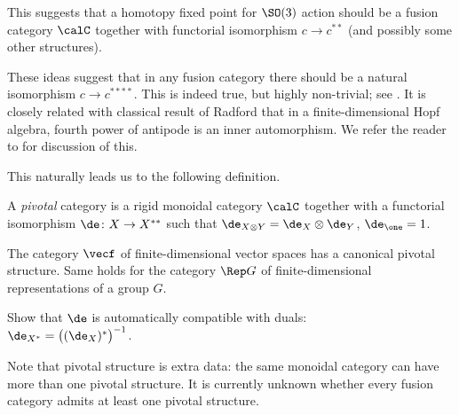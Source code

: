 This suggests that a homotopy fixed point for $\SO(3)$ action should be a fusion
category $\calC$ together with functorial isomorphism $c\to c^{**}$ (and
possibly some other structures).

\begin{remark}\label{r:radford}
  These ideas suggest that in any fusion category there should be a natural
  isomorphism $c\to c^{****}$. This is indeed true, but highly non-trivial; see
  \cite[Corollary 7.19.3]{etingof-fusion}. It is closely related with
  classical result of Radford that in a finite-dimensional Hopf algebra, fourth
  power of antipode is an inner automorphism. We refer the reader to
  \cite[Section 7.19]{etingof-fusion} for discussion of this.
\end{remark}

This naturally leads us to the following definition.

\begin{definition}\label{d:pivotal}
  A \emph{pivotal} category is a rigid monoidal category $\calC$ together with a
  functorial isomorphism $\de\colon X\to X^{**}$ such that $\de_{X\otimes Y} =
  \de_X \otimes \de_Y$, $\de_{\one}=1$.
\end{definition}

\begin{example}\label{x:vecf-pivotal}
  The category $\vecf$ of finite-dimensional vector spaces has a canonical
  pivotal structure. Same holds for the category $\Rep G$ of finite-dimensional
  representations of a group $G$.
\end{example}

\begin{exercise}\label{ec:pivotal-duals-compatible}
  Show that $\de$ is automatically compatible with duals:\\
  $\de_{X^*}=\bigl((\de_X)^*\bigr)^{-1}$.
\end{exercise}

Note that pivotal structure is extra data: the same monoidal category can have
more than one pivotal structure. It is currently unknown whether every fusion
category admits at least one pivotal structure.


